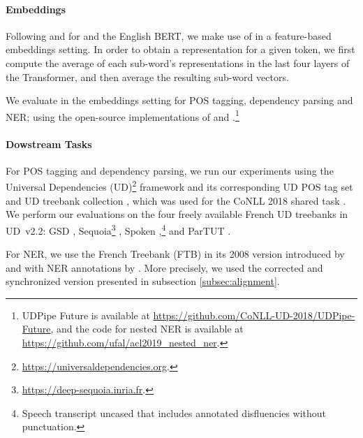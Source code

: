 \paragraph{Embeddings}

Following \citet{strakova-etal-2019-neural} and \citet{straka-strakova-2019-evaluating} for \mbert and the English BERT, we make use of \camembert in a feature-based embeddings setting. In order to obtain a representation for a given token, we first compute the average of each sub-word’s representations in the last four layers of the Transformer, and then average the resulting sub-word vectors.

We evaluate \camembert in the embeddings setting for POS tagging, dependency parsing and NER; using the open-source implementations of \citet{straka-strakova-2019-evaluating} and \citet{strakova-etal-2019-neural}.\footnote{UDPipe Future is available at \url{https://github.com/CoNLL-UD-2018/UDPipe-Future}, and the code for nested NER is available at \url{https://github.com/ufal/acl2019_nested_ner}.}


\paragraph{Dowstream Tasks}

For POS tagging and dependency parsing, we run our experiments using the Universal Dependencies (UD)\footnote{\url{https://universaldependencies.org}.} framework and its corresponding UD POS tag set \citep{petrov-etal-2012-universal} and UD treebank collection \citep{nivre-etal-2018-universal}, which was used for the CoNLL 2018 shared task \citep{seker-etal-2018-universal}. We perform our evaluations on the four freely available French UD treebanks in UD~v2.2: GSD \citep{mcdonald-etal-2013-universal}, Sequoia\footnote{\url{https://deep-sequoia.inria.fr}.} \citep{candito-seddah-2012-le,candito-etal-2014-deep}, Spoken \citep{lacheret-etal-2014-rhapsodie,bawden-etal-2014-correcting},\footnote{Speech transcript uncased that includes annotated disfluencies without punctuation.} and ParTUT \cite{sanguinetti-Bosco-2015-parttut}.

For NER, we use the French Treebank (FTB) \citep{abeille-etal-2003-building} in its 2008 version introduced by \citet{candito-crabbe-2009-improving} and with NER annotations by \citet{sagot-etal-2012-annotation}. More precisely, we used the corrected and synchronized version \citep{ortiz-suarez-etal-2020-establishing} presented in subsection \ref{subsec:alignment}.

